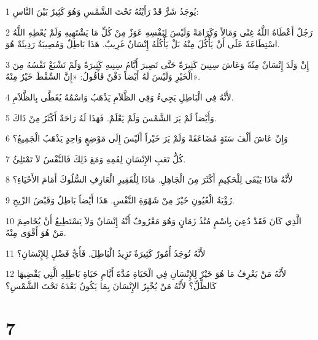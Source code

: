 \par 1 يُوجَدُ شَرٌّ قَدْ رَأَيْتُهُ تَحْتَ الشَّمْسِ وَهُوَ كَثِيرٌ بَيْنَ النَّاسِ:
\par 2 رَجُلٌ أَعْطَاهُ اللَّهُ غِنًى وَمَالاً وَكَرَامَةً وَلَيْسَ لِنَفْسِهِ عَوَزٌ مِنْ كُلِّ مَا يَشْتَهِيهِ وَلَمْ يُعْطِهِ اللَّهُ اسْتِطَاعَةً عَلَى أَنْ يَأْكُلَ مِنْهُ بَلْ يَأْكُلُهُ إِنْسَانٌ غَرِيبٌ. هَذَا بَاطِلٌ وَمُصِيبَةٌ رَدِيئَةٌ هُوَ.
\par 3 إِنْ وَلَدَ إِنْسَانٌ مِئَةً وَعَاشَ سِنِينَ كَثِيرَةً حَتَّى تَصِيرَ أَيَّامُ سِنِيهِ كَثِيرَةً وَلَمْ تَشْبَعْ نَفْسُهُ مِنَ الْخَيْرِ وَلَيْسَ لَهُ أَيْضاً دَفْنٌ فَأَقُولُ: «إِنَّ السِّقْطَ خَيْرٌ مِنْهُ».
\par 4 لأَنَّهُ فِي الْبَاطِلِ يَجِيءُ وَفِي الظَّلاَمِ يَذْهَبُ وَاسْمُهُ يُغَطَّى بِالظَّلاَمِ.
\par 5 وَأَيْضاً لَمْ يَرَ الشَّمْسَ وَلَمْ يَعْلَمْ. فَهَذَا لَهُ رَاحَةٌ أَكْثَرُ مِنْ ذَاكَ.
\par 6 وَإِنْ عَاشَ أَلْفَ سَنَةٍ مُضَاعَفَةً وَلَمْ يَرَ خَيْراً أَلَيْسَ إِلَى مَوْضِعٍ وَاحِدٍ يَذْهَبُ الْجَمِيعُ؟
\par 7 كُلُّ تَعَبِ الإِنْسَانِ لِفَمِهِ وَمَعَ ذَلِكَ فَالنَّفْسُ لاَ تَمْتَلِئُ.
\par 8 لأَنَّهُ مَاذَا يَبْقَى لِلْحَكِيمِ أَكْثَرَ مِنَ الْجَاهِلِ. مَاذَا لِلْفَقِيرِ الْعَارِفِ السُّلُوكَ أَمَامَ الأَحْيَاءِ؟
\par 9 رُؤْيَةُ الْعُيُونِ خَيْرٌ مِنْ شَهْوَةِ النَّفْسِ. هَذَا أَيْضاً بَاطِلٌ وَقَبْضُ الرِّيحِ.
\par 10 الَّذِي كَانَ فَقَدْ دُعِيَ بِاسْمٍ مُنْذُ زَمَانٍ وَهُوَ مَعْرُوفٌ أَنَّهُ إِنْسَانٌ وَلاَ يَسْتَطِيعُ أَنْ يُخَاصِمَ مَنْ هُوَ أَقْوَى مِنْهُ.
\par 11 لأَنَّهُ تُوجَدُ أُمُورٌ كَثِيرَةٌ تَزِيدُ الْبَاطِلَ. فَأَيُّ فَضْلٍ لِلإِنْسَانِ؟
\par 12 لأَنَّهُ مَنْ يَعْرِفُ مَا هُوَ خَيْرٌ لِلإِنْسَانِ فِي الْحَيَاةِ مُدَّةَ أَيَّامِ حَيَاةِ بَاطِلِهِ الَّتِي يَقْضِيهَا كَالظِّلِّ؟ لأَنَّهُ مَنْ يُخْبِرُ الإِنْسَانَ بِمَا يَكُونُ بَعْدَهُ تَحْتَ الشَّمْسِ؟

\chapter{7}

